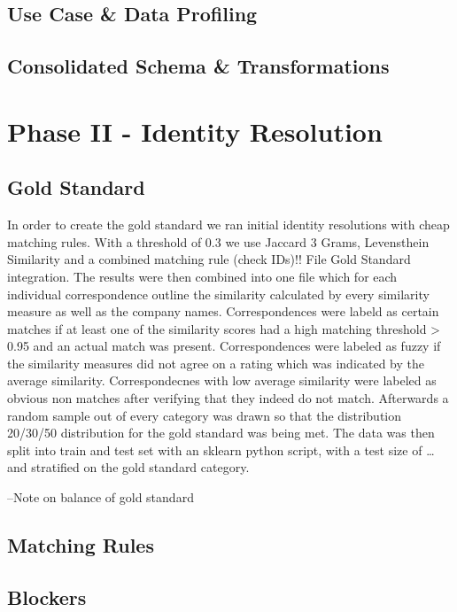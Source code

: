 \documentclass[11pt,titlepage,oneside,openany]{book}
\begin{document}
 
\section{Use Case \& Data Profiling}


\section{Consolidated Schema \& Transformations}


\chapter{Phase II - Identity Resolution}
\label{cha:identity-resolution}

\section{Gold Standard}
\label{sec:gold-standard-IR}

In order to create the gold standard we ran initial identity resolutions with cheap matching rules. With a threshold of 0.3 we use Jaccard 3 Grams, Levensthein Similarity and a combined matching rule (check IDs)!! File Gold Standard integration.
The results were then combined into one file which for each individual correspondence outline the similarity calculated by every similarity measure as well as the company names.
Correspondences were labeld as certain matches if at least one of the similarity scores had a high matching threshold > 0.95 and an actual match was present.
Correspondences were labeled as fuzzy if the similarity measures did not agree on a rating which was indicated by the average similarity. 
Correspondecnes with low average similarity were labeled as obvious non matches after verifying that they indeed do not match.
Afterwards a random sample out of every category was drawn so that the distribution 20/30/50 distribution for the gold standard was being met.
The data was then split into train and test set with an sklearn python script, with a test size of … and stratified on the gold standard category.

--Note on balance of gold standard

\section{Matching Rules}
\label{sec:good}

\section{Blockers}
\label{sec:good}
\end{document}
